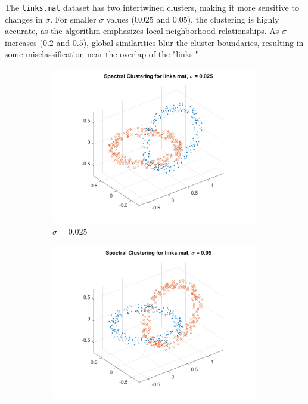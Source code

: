 \documentclass[11pt]{article}
\begin{document}
The \texttt{links.mat} dataset has two intertwined clusters, making it more sensitive to changes in \(\sigma\). For smaller \(\sigma\) values (\(0.025\) and \(0.05\)), the clustering is highly accurate, as the algorithm emphasizes local neighborhood relationships. As \(\sigma\) increases (\(0.2\) and \(0.5\)), global similarities blur the cluster boundaries, resulting in some misclassification near the overlap of the "links."

\begin{figure}[!ht]
    \centering
    \begin{subfigure}{0.45\textwidth}
        \includegraphics[width=\linewidth]{links_sigma_0.025.png}
        \caption{\(\sigma = 0.025\)}
    \end{subfigure}
    \begin{subfigure}{0.45\textwidth}
        \includegraphics[width=\linewidth]{links_sigma_0.050.png}

\end{subfigure}
\end{figure}
\end{document}
